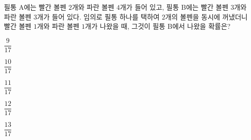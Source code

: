 필통 A에는 빨간 볼펜 $2$개와 파란 볼펜 $4$개가 들어 있고, 필통 B에는 빨간 볼펜 $3$개와 파란 볼펜 $3$개가 들어 있다. 임의로 필통 하나를 택하여 $2$개의 볼펜을 동시에 꺼냈더니 빨간 볼펜 $1$개와 파란 볼펜 $1$개가 나왔을 때, 그것이 필통 B에서 나왔을 확률은?
\begin{choices32}{\rule[-3ex]{0pt}{8ex}$\dfrac{9}{17}$}{\rule[-3ex]{0pt}{8ex}$\dfrac{10}{17}$}{\rule[-3ex]{0pt}{8ex}$\dfrac{11}{17}$}{\rule[-3ex]{0pt}{8ex}$\dfrac{12}{17}$}{\rule[-3ex]{0pt}{8ex}$\dfrac{13}{17}$}\end{choices32}
